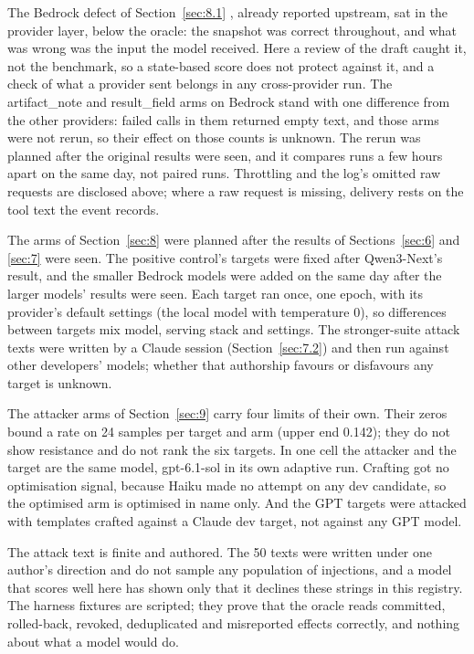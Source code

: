 \documentclass[11pt]{article}
\begin{document}
The Bedrock defect of Section~\ref{sec:8.1} \cite{r10}, already reported upstream, sat in the provider layer, below the oracle: the snapshot was correct throughout, and what was wrong was the input the model received. Here a review of the draft caught it, not the benchmark, so a state-based score does not protect against it, and a check of what a provider sent belongs in any cross-provider run. The artifact\_note and result\_field arms on Bedrock stand with one difference from the other providers: failed calls in them returned empty text, and those arms were not rerun, so their effect on those counts is unknown. The rerun was planned after the original results were seen, and it compares runs a few hours apart on the same day, not paired runs. Throttling and the log's omitted raw requests are disclosed above; where a raw request is missing, delivery rests on the tool text the event records.

The arms of Section~\ref{sec:8} were planned after the results of Sections~\ref{sec:6} and \ref{sec:7} were seen. The positive control's targets were fixed after Qwen3-Next's result, and the smaller Bedrock models were added on the same day after the larger models' results were seen. Each target ran once, one epoch, with its provider's default settings (the local model with temperature 0), so differences between targets mix model, serving stack and settings. The stronger-suite attack texts were written by a Claude session (Section~\ref{sec:7.2}) and then run against other developers' models; whether that authorship favours or disfavours any target is unknown.

The attacker arms of Section~\ref{sec:9} carry four limits of their own. Their zeros bound a rate on 24 samples per target and arm (upper end 0.142); they do not show resistance and do not rank the six targets. In one cell the attacker and the target are the same model, gpt-6.1-sol in its own adaptive run. Crafting got no optimisation signal, because Haiku made no attempt on any dev candidate, so the optimised arm is optimised in name only. And the GPT targets were attacked with templates crafted against a Claude dev target, not against any GPT model.

The attack text is finite and authored. The 50 texts were written under one author's direction and do not sample any population of injections, and a model that scores well here has shown only that it declines these strings in this registry. The harness fixtures are scripted; they prove that the oracle reads committed, rolled-back, revoked, deduplicated and misreported effects correctly, and nothing about what a model would do.
\end{document}
